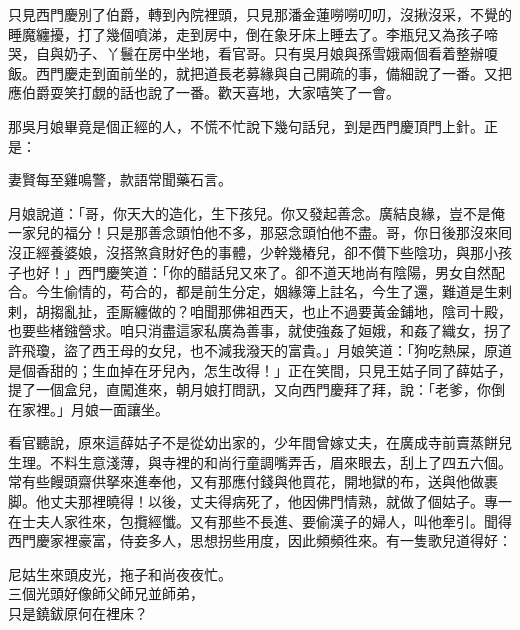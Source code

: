 只見西門慶別了伯爵，轉到內院裡頭，只見那潘金蓮嘮嘮叨叨，沒揪沒采，不覺的睡魔纏擾，打了幾個噴涕，走到房中，倒在象牙床上睡去了。李瓶兒又為孩子啼哭，自與奶子、丫鬟在房中坐地，看官哥。只有吳月娘與孫雪娥兩個看着整辦嗄飯。西門慶走到面前坐的，就把道長老募緣與自己開疏的事，備細說了一番。又把應伯爵耍笑打覷的話也說了一番。歡天喜地，大家嘻笑了一會。

那吳月娘畢竟是個正經的人，不慌不忙說下幾句話兒，到是西門慶頂門上針。正是：

\begin{myquote} 
妻賢每至雞鳴警，款語常聞藥石言。
\end{myquote} 

月娘說道：「哥，你天大的造化，生下孩兒。你又發起善念。廣結良緣，豈不是俺一家兒的福分！只是那善念頭怕他不多，那惡念頭怕他不盡。{}哥，你日後那沒來囘沒正經養婆娘，沒搭煞貪財好色的事體，少幹幾樁兒，卻不儹下些陰功，與那小孩子也好！」西門慶笑道：「你的醋話兒又來了。卻不道天地尚有陰陽，男女自然配合。今生偷情的，苟合的，都是前生分定，姻緣簿上註名，今生了還，難道是生剌剌，胡搊亂扯，歪厮纏做的？{}咱聞那佛祖西天，也止不過要黃金鋪地，陰司十殿，也要些楮鏹營求。咱只消盡這家私廣為善事，就使強姦了姮娥，和姦了織女，拐了許飛瓊，盜了西王母的女兒，也不減我潑天的富貴。」{}月娘笑道：「狗吃熱屎，原道是個香甜的；生血掉在牙兒內，怎生改得！」{}正在笑間，只見王姑子同了薛姑子，提了一個盒兒，直闖進來，朝月娘打問訊，又向西門慶拜了拜，說：「老爹，你倒在家裡。」月娘一面讓坐。

看官聽說，原來這薛姑子不是從幼出家的，少年間曾嫁丈夫，在廣成寺前賣蒸餅兒生理。{}不料生意淺薄，與寺裡的和尚行童調嘴弄舌，眉來眼去，刮上了四五六個。常有些饅頭齋供拏來進奉他，又有那應付錢與他買花，開地獄的布，送與他做裹脚。{}他丈夫那裡曉得！以後，丈夫得病死了，他因佛門情熟，就做了個姑子。專一在士夫人家徃來，包攬經懺。又有那些不長進、要偷漢子的婦人，叫他牽引。聞得西門慶家裡豪富，侍妾多人，思想拐些用度，因此頻頻徃來。有一隻歌兒道得好：

\begin{myquote} 
尼姑生來頭皮光，拖子和尚夜夜忙。\\三個光頭好像師父師兄並師弟，{}\\只是鐃鈸原何在裡床？{}
\end{myquote} 

